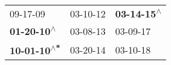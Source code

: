 \begin{supertabular}{lll}
                   09-17-09\textsuperscript{} &  03-10-12\textsuperscript{} &  \textbf{03-14-15\textsuperscript{$\wedge$}} \\
  \textbf{01-20-10\textsuperscript{$\wedge$}} &  03-08-13\textsuperscript{} &                   03-09-17\textsuperscript{} \\
 \textbf{10-01-10\textsuperscript{$\wedge$*}} &  03-20-14\textsuperscript{} &                   03-10-18\textsuperscript{} \\
\end{supertabular}
